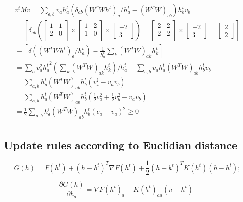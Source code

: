 \documentclass[oneside, final, 14pt]{extarticle}
\begin{document}
\begin{multline*}
  v^t M v =
  \sum_{a,b}v_a h_a^t (\delta_{ab}(W^TWh^t)_a / h_a^t
  -(W^TW)_{ab})h_b^t v_b \\
  =
  \left[
    \delta_{ab}
    \left(
      \begin{bmatrix}1 & 1 \\ 2 & 0 \\ \end{bmatrix} \times
      \begin{bmatrix}1 & 2 \\ 1 & 0 \\ \end{bmatrix} \times
      \begin{bmatrix} -2 \\ 3 \end{bmatrix}
    \right) =
      \begin{bmatrix}2 & 2 \\ 2 & 2 \\ \end{bmatrix} \times
      \begin{bmatrix} -2 \\ 3 \end{bmatrix} =
      \begin{bmatrix} 2 \\ 2 \end{bmatrix}
  \right] \\
  =
  \left[
    \delta((W^TWh^t)_a / h_a^t) =
    \frac{1}{h_a^t} \sum_k (W^TW)_{ak} h_k^t
  \right] \\
  =
  \sum_a v_a^2 {h_a^t}^2 (\sum_k(W^TW)_{ak}h_k^t)/h_a^t -
    \sum_{a,b} v_ah_a^t(W^TW)_{ab}h_b^tv_b \\
  = \sum_{a,b}h_a^t(W^TW)_{ab}h_b^t(v_a^2 - v_av_b) \\
  = \sum_{a,b}h_a^t(W^TW)_{ab}h_b^t(
    \frac{1}{2}v_a^2 + \frac{1}{2}v_b^2 - v_av_b) \\
  = \frac{1}{2} \sum_{a,b}h_a^t(W^TW)_{ab}h_b^t(v_a - v_a)^2 \geqslant 0 \\
\end{multline*}

\subsection{Update rules according to Euclidian distance}

\[
  G(h) = F(h^t) + (h-h^t)^T \nabla F(h^t) +
    \frac{1}{2} (h-h^t)^T K(h^t) (h-h^t);
\]

\[
  \frac{\partial G(h)}{\partial h_a} =
    \nabla F(h^t)_a + K(h^t)_{aa} (h-h^t);
\]
\end{document}
